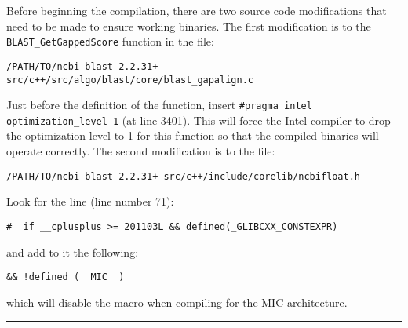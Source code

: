 \documentclass[10pt]{article}
\begin{document}
\noindent Before beginning the compilation, there are two source code modifications that need to be made to ensure working binaries.  The first modification is to the \verb^BLAST_GetGappedScore^ function in the file:
\begin{verbatim}
/PATH/TO/ncbi-blast-2.2.31+-src/c++/src/algo/blast/core/blast_gapalign.c
\end{verbatim}
Just before the definition of the function, insert \verb^#pragma intel optimization_level 1^ (at line 3401).  This will force the Intel compiler to drop the optimization level to 1 for this function so that the
compiled binaries will operate correctly.  The second modification is to the file:
\begin{verbatim}
/PATH/TO/ncbi-blast-2.2.31+-src/c++/include/corelib/ncbifloat.h
\end{verbatim}
\noindent Look for the line (line number 71):
\begin{verbatim}
#  if __cplusplus >= 201103L && defined(_GLIBCXX_CONSTEXPR)
\end{verbatim}
\noindent and add to it the following:
\begin{verbatim}
&& !defined (__MIC__)
\end{verbatim}
\noindent which will disable the macro when compiling for the MIC architecture.

\noindent \rule{16cm}{0.4pt} \\
\end{document}
